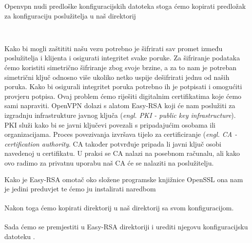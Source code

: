     \noindent
    Openvpn nudi predloške konfiguracijskih datoteka stoga ćemo kopirati
    predložak za konfiguraciju poslužitelja u naš direktorij

    \noindent
     \\

        Kako bi mogli zaštititi našu vezu potrebno je šifrirati sav promet
        između poslužitelja i klijenta i osigurati integritet svake poruke.
        Za šifriranje podataka ćemo koristiti simetrično šifriranje zbog svoje
        brzine, a za to nam je potreban simetrični ključ odnosno više ukoliko
        netko uspije dešifrirati jednu od naših poruka. Kako bi osigurali
        integritet poruka potrebno ih je potpisati i omogućiti provjeru
        potpisa. Ovaj problem ćemo riješiti digitalnim certifikatima koje ćemo
        sami napraviti. OpenVPN dolazi s alatom Easy-RSA koji će nam poslužiti za izgradnju
        infrastrukture javnog ključa (\textit{engl. PKI - public key
        infrastructure}). PKI služi kako bi se javni ključevi povezali s
        pripadajućim osobama ili organizacijama. Proces povezivanja izvršava
        tijelo za certificiranje (\textit{engl. CA - certification authority}.
        CA također potvrđuje pripada li javni ključ osobi navedenoj u
        certifikatu. U praksi se CA nalazi na posebnom računalu, ali kako ovo
        radimo za privatnu uporabu naš CA će se nalaziti na poslužitelju.

        Kako je Easy-RSA omotač oko složene programske knjižnice OpenSSL ona
        nam je jedini preduvjet te ćemo ju instalirati naredbom \\

        \noindent
         \\

        Nakon toga ćemo kopirati  direktorij u naš direktorij sa svom
        konfiguracijom. \\

        \noindent
         \\

        Sada ćemo se premjestiti u Easy-RSA direktoriji i urediti njegovu
        konfiguracijsku datoteku . \\

